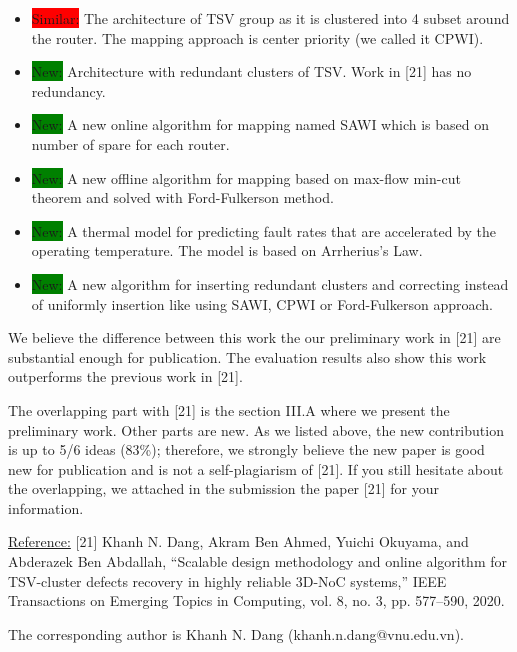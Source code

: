 \documentclass[12pt]{article}
\begin{document}
\begin{sf}
\begin{itemize}
	\item \colorbox{red}{Similar:} The architecture of TSV group as it is clustered into 4 subset around the router. The mapping approach is center priority (we called it CPWI).
	\item \colorbox{green}{New:} Architecture with redundant clusters of TSV. Work in [21] has no redundancy.
	\item \colorbox{green}{New:} A new online algorithm for  mapping named SAWI which is based on number of spare for each router.
	\item \colorbox{green}{New:} A new offline algorithm for  mapping based on max-flow min-cut theorem and solved with Ford-Fulkerson method.
	\item \colorbox{green}{New:} A thermal model for predicting fault rates that are accelerated by the operating temperature. The model is based on Arrherius's Law.
	\item \colorbox{green}{New:} A new algorithm for inserting redundant clusters and correcting instead of uniformly insertion like using SAWI, CPWI or Ford-Fulkerson approach.

	
\end{itemize} 

We believe the difference between this work the our preliminary work in [21] are substantial enough for publication. The evaluation results also show this work outperforms the previous work in [21].

The overlapping part with [21] is the section III.A where we present the preliminary work. Other parts are new. As we listed above, the new contribution is up to 5/6 ideas (83\%); therefore, we strongly believe the new paper is good new for publication and is not a self-plagiarism of [21]. If you still hesitate about the overlapping, we attached in the submission the paper [21] for your information.

\vspace{.3cm}

\noindent
{\small  \underline{Reference:}  [21]  Khanh N. Dang, Akram Ben Ahmed, Yuichi Okuyama, and Abderazek Ben Abdallah, ``Scalable design methodology and online algorithm 	for TSV-cluster defects recovery in highly reliable 3D-NoC systems,''
	IEEE Transactions on Emerging Topics in Computing, vol. 8, no. 3, 	pp. 577–590, 2020.
}

\vspace{.3cm}


\vspace{.3cm}
\noindent
The corresponding author is Khanh N. Dang (khanh.n.dang@vnu.edu.vn).


\end{sf}
\end{document}
